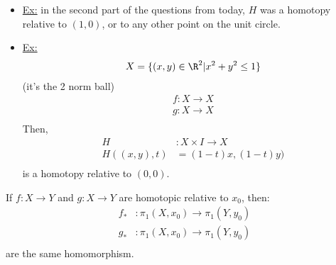     \begin{itemize}
        \item \underline{Ex:} in the second part of the questions from today, $H$ was a homotopy relative to $(1,0)$, or
            to any other point on the unit circle.
        \item \underline{Ex:}
            \begin{align*}
                X=\{(x,y)\in \R^2 | x^2+y^2\leq 1\}\\
            \end{align*}
            (it's the 2 norm ball)
            \begin{align*}
                f: X\rightarrow X\\
                g: X\rightarrow X\\
            \end{align*}
            Then,
            \begin{align*}
                H&: X\times I \rightarrow X\\
                H((x,y),t)&=(1-t)x, (1-t)y)\\
            \end{align*}
            is a homotopy relative to $(0,0)$.
    \end{itemize}
        \begin{theorem} If $f:X\rightarrow Y$ and $g:X\rightarrow Y$ are
            homotopic relative to $x_0$, then:
                \begin{align*}
                    f_{*}&:\pi_1(X,x_0)\rightarrow \pi_1(Y,y_0)\\
                    g_{*}&:\pi_1(X,x_0)\rightarrow \pi_1(Y,y_0)\\
                \end{align*}
                are the same homomorphism.
        \end{theorem}
